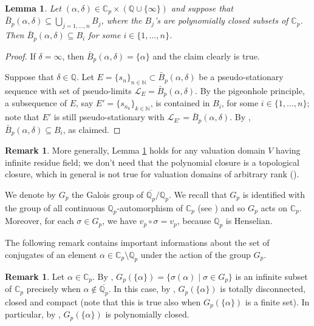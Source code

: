 \documentclass[10pt]{article}
\numberwithin{equation}{section}
\newtheorem{Lem}[equation]{Lemma}
\theoremstyle{definition}
\newtheorem{Rem}[equation]{Remark}
\theoremstyle{definition}
\newcommand{\Q}{\mathbb{Q}}
\newcommand{\N}{\mathbb{N}}
\newcommand{\C}{\mathbb{C}}
\newcommand{\oQp}{\overline{\Q_p}}
\begin{document}
\begin{Lem}\label{lem:ball containment}
Let $(\alpha,\delta)\in \C_p\times(\Q\cup\{\infty\})$ and suppose that $\bar B_p(\alpha,\delta)\subseteq \bigcup\limits_{j=1,\ldots,n}B_j$, 
where the $B_j$'s are polynomially closed subsets of $\C_p$. Then $\bar B_p(\alpha,\delta)\subseteq B_i$ for some $i\in\{1,\ldots,n\}$.
\end{Lem}
\begin{proof}
If $\delta=\infty$, then $\bar B_p(\alpha,\delta)=\{\alpha\}$ and the claim clearly is true.

Suppose that $\delta\in\Q$. Let $E=\{s_n\}_{n\in\N}\subset \bar B_p(\alpha,\delta)$ be a pseudo-stationary sequence with set of pseudo-limits $\mathcal{L}_E=\bar B_p(\alpha,\delta)$.  
By the pigeonhole principle, a subsequence of $E$, say $E'=\{s_{n_k}\}_{k\in\N}$, is contained in $B_i$, for some $i\in\{1,\ldots,n\}$; 
note that $E'$ is still pseudo-stationary with $\mathcal{L}_{E'}=\bar B_p(\alpha,\delta)$. By \cite[Proposition 4.8]{ChabPolCloVal}, 
$\bar B_p(\alpha,\delta)\subseteq B_i$, as claimed.
\end{proof}

\begin{Rem} More generally, Lemma \ref{lem:ball containment} holds for any valuation domain $V$ having infinite residue field; 
we don't need that the polynomial closure is a topological closure, 
which in general is not true for valuation domains of arbitrary rank (\cite{PSpolclo}).
\end{Rem}

We denote by $G_p$ the Galois group of $\oQp/\Q_p$. We recall that $G_p$ is identified with 
the group of all continuous $\Q_p$-automorphism of $\C_p$ (see \cite[\S 3, 1.]{APZclosed}) and so $G_p$ acts on $\C_p$. 
Moreover, for each $\sigma\in G_p$, we have $v_p\circ\sigma=v_p$, because $\Q_p$ is Henselian.

The following remark contains important informations about the set of conjugates of an element $\alpha\in\C_p\setminus\Q_p$ under the action of the group $G_p$.

\begin{Rem}\label{conjugate transcendental element}
Let $\alpha\in\C_p$. By \cite[Remark 3.2]{APZclosed}, $G_p(\{\alpha\})=\{\sigma(\alpha)\mid \sigma\in G_p\}$ is 
an infinite subset of $\C_p$ precisely when $\alpha\notin\oQp$. In this case, by \cite[Theorem 3.5]{APZclosed}, $G_p(\{\alpha\})$ 
is totally disconnected, closed and compact (note that this is true also when $G_p(\{\alpha\})$ is a finite set). 
In particular, by \cite[Proposition 2.4]{ChabPolCloVal}, $G_p(\{\alpha\})$ is polynomially closed.
\end{Rem}
\end{document}
